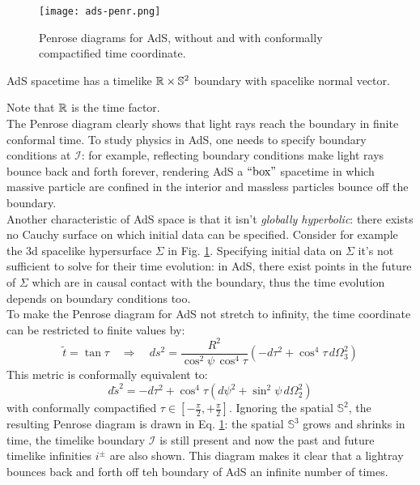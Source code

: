 \begin{figure}
  \centering
  \texttt{[image: ads-penr.png]}
  \caption{Penrose diagrams for AdS, without and with conformally compactified time coordinate.}
  \label{ads-penr}
\end{figure}

\begin{proposition}
  AdS spacetime has a timelike $ \mathbb{R} \times \mathbb{S}^2 $ boundary with spacelike normal vector.
\end{proposition}

Note that $ \mathbb{R} $ is the time factor.\\
The Penrose diagram clearly shows that light rays reach the boundary in finite conformal time. To study physics in AdS, one needs to specify boundary conditions at $ \mathcal{I} $: for example, reflecting boundary conditions make light rays bounce back and forth forever, rendering AdS a $ ``\text{box}" $ spacetime in which massive particle are confined in the interior and massless particles bounce off the boundary.\\
Another characteristic of AdS space is that it isn't \textit{globally hyperbolic}: there exists no Cauchy surface on which initial data can be specified. Consider for example the 3d spacelike hypersurface $ \Sigma $ in Fig. \ref{ads-penr}. Specifying initial data on $ \Sigma $ it's not sufficient to solve for their time evolution: in AdS, there exist points in the future of $ \Sigma $ which are in causal contact with the boundary, thus the time evolution depends on boundary conditions too.\\
To make the Penrose diagram for AdS not stretch to infinity, the time coordinate can be restricted to finite values by:
\begin{equation*}
  \tilde{t} = \tan \tau
  \quad \Rightarrow \quad
  ds^2 = \frac{R^2}{\cos^2 \psi \, \cos^4 \tau} \left( -d\tau^2 + \cos^4 \tau \, d\Omega_3^2 \right)
\end{equation*}
This metric is conformally equivalent to:
\begin{equation*}
  d\tilde{s}^2 = - d\tau^2 + \cos^4 \tau \left( d\psi^2 + \sin^2 \psi \, d\Omega_2^2 \right)
\end{equation*}
with conformally compactified $ \tau \in \left[ - \frac{\pi}{2}, + \frac{\pi}{2} \right] $. Ignoring the spatial $ \mathbb{S}^2 $, the resulting Penrose diagram is drawn in Eq. \ref{ads-penr}: the spatial $ \mathbb{S}^3 $ grows and shrinks in time, the timelike boundary $ \mathcal{I} $ is still present and now the past and future timelike infinities $ i^{\pm} $ are also shown. This diagram makes it clear that a lightray bounces back and forth off teh boundary of AdS an infinite number of times.

